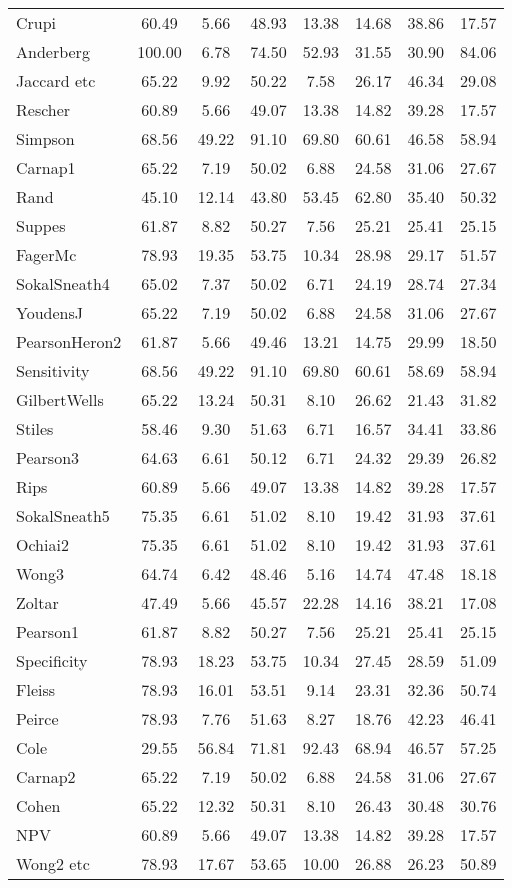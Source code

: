 \begin{tabular}{l||c|c|c|c|c|c|c}
Crupi& 60.49& 5.66& 48.93& 13.38& 14.68& 38.86& 17.57\\
Anderberg& 100.00& 6.78& 74.50& 52.93& 31.55& 30.90& 84.06\\
Jaccard etc& 65.22& 9.92& 50.22& 7.58& 26.17& 46.34& 29.08\\
Rescher& 60.89& 5.66& 49.07& 13.38& 14.82& 39.28& 17.57\\
Simpson& 68.56& 49.22& 91.10& 69.80& 60.61& 46.58& 58.94\\
Carnap1& 65.22& 7.19& 50.02& 6.88& 24.58& 31.06& 27.67\\
Rand& 45.10& 12.14& 43.80& 53.45& 62.80& 35.40& 50.32\\
Suppes& 61.87& 8.82& 50.27& 7.56& 25.21& 25.41& 25.15\\
FagerMc& 78.93& 19.35& 53.75& 10.34& 28.98& 29.17& 51.57\\
SokalSneath4& 65.02& 7.37& 50.02& 6.71& 24.19& 28.74& 27.34\\
YoudensJ& 65.22& 7.19& 50.02& 6.88& 24.58& 31.06& 27.67\\
PearsonHeron2& 61.87& 5.66& 49.46& 13.21& 14.75& 29.99& 18.50\\
Sensitivity& 68.56& 49.22& 91.10& 69.80& 60.61& 58.69& 58.94\\
GilbertWells& 65.22& 13.24& 50.31& 8.10& 26.62& 21.43& 31.82\\
Stiles& 58.46& 9.30& 51.63& 6.71& 16.57& 34.41& 33.86\\
Pearson3& 64.63& 6.61& 50.12& 6.71& 24.32& 29.39& 26.82\\
Rips& 60.89& 5.66& 49.07& 13.38& 14.82& 39.28& 17.57\\
SokalSneath5& 75.35& 6.61& 51.02& 8.10& 19.42& 31.93& 37.61\\
Ochiai2& 75.35& 6.61& 51.02& 8.10& 19.42& 31.93& 37.61\\
Wong3& 64.74& 6.42& 48.46& 5.16& 14.74& 47.48& 18.18\\
Zoltar& 47.49& 5.66& 45.57& 22.28& 14.16& 38.21& 17.08\\
Pearson1& 61.87& 8.82& 50.27& 7.56& 25.21& 25.41& 25.15\\
Specificity& 78.93& 18.23& 53.75& 10.34& 27.45& 28.59& 51.09\\
Fleiss& 78.93& 16.01& 53.51& 9.14& 23.31& 32.36& 50.74\\
Peirce& 78.93& 7.76& 51.63& 8.27& 18.76& 42.23& 46.41\\
Cole& 29.55& 56.84& 71.81& 92.43& 68.94& 46.57& 57.25\\
Carnap2& 65.22& 7.19& 50.02& 6.88& 24.58& 31.06& 27.67\\
Cohen& 65.22& 12.32& 50.31& 8.10& 26.43& 30.48& 30.76\\
NPV& 60.89& 5.66& 49.07& 13.38& 14.82& 39.28& 17.57\\
Wong2 etc& 78.93& 17.67& 53.65& 10.00& 26.88& 26.23& 50.89\\
\end{tabular}